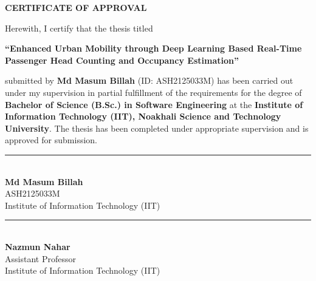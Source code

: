 \thispagestyle{empty} %

\begin{center}
	{\Large\bfseries CERTIFICATE OF APPROVAL}
\end{center}

Herewith, I certify that the thesis titled 

\begin{center}
	\textbf{``Enhanced Urban Mobility through Deep Learning Based Real-Time
		Passenger Head Counting and Occupancy Estimation''}
\end{center}

\noindent
submitted by \textbf{Md Masum Billah} (ID: ASH2125033M) has been carried out under my supervision in partial fulfillment of the requirements for the degree of \textbf{Bachelor of Science (B.Sc.) in Software Engineering} at the \textbf{Institute of Information Technology (IIT), Noakhali Science and Technology University}. The thesis has been completed under appropriate supervision and is approved for submission.

\vspace{3.5cm}

\noindent
\begin{minipage}[t]{0.45\textwidth}
	\centering
	\rule{6cm}{0.4pt}\\[0.15cm]
	\textbf{Md Masum Billah}\\
	ASH2125033M\\
	Institute of Information Technology (IIT)
\end{minipage}
\hfill
\begin{minipage}[t]{0.45\textwidth}
	\centering
	\rule{6cm}{0.4pt}\\[0.15cm]
	\textbf{Nazmun Nahar}\\
	Assistant Professor\\
	Institute of Information Technology (IIT)
\end{minipage}

\clearpage